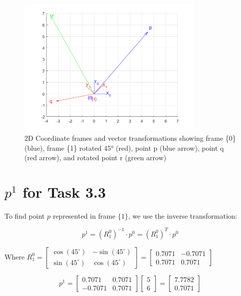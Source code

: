 \documentclass[11pt,a4paper]{article}
\begin{document}
\begin{figure}[H]
    \centering
    \includegraphics[width=0.8\textwidth]{task_1.png}
    \caption{2D Coordinate frames and vector transformations showing frame \{0\} (blue), frame \{1\} rotated 45° (red), point p (blue arrow), point q (red arrow), and rotated point r (green arrow)}
\end{figure}

\section{$p^1$ for Task 3.3}

To find point $p$ represented in frame $\{1\}$, we use the inverse transformation:

$$p^1 = (R_1^0)^{-1} \cdot p^0 = (R_1^0)^T \cdot p^0$$

Where $R_1^0 = \begin{bmatrix} 
\cos(45^\circ) & -\sin(45^\circ) \\ 
\sin(45^\circ) & \cos(45^\circ) 
\end{bmatrix} = \begin{bmatrix} 
0.7071 & -0.7071 \\ 
0.7071 & 0.7071 
\end{bmatrix}$

$$p^1 = \begin{bmatrix} 
0.7071 & 0.7071 \\ 
-0.7071 & 0.7071 
\end{bmatrix} \begin{bmatrix} 5 \\ 6 \end{bmatrix} = \begin{bmatrix} 7.7782 \\ 0.7071 \end{bmatrix}$$
\end{document}
